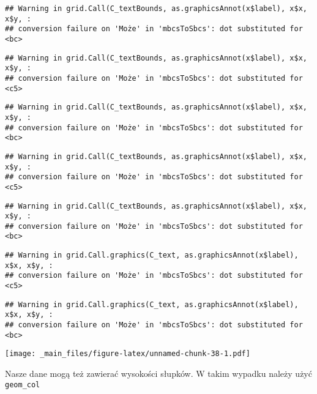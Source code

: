 \documentclass[
]{book}
\begin{document}
\begin{verbatim}
## Warning in grid.Call(C_textBounds, as.graphicsAnnot(x$label), x$x, x$y, :
## conversion failure on 'Może' in 'mbcsToSbcs': dot substituted for <bc>
\end{verbatim}

\begin{verbatim}
## Warning in grid.Call(C_textBounds, as.graphicsAnnot(x$label), x$x, x$y, :
## conversion failure on 'Może' in 'mbcsToSbcs': dot substituted for <c5>
\end{verbatim}

\begin{verbatim}
## Warning in grid.Call(C_textBounds, as.graphicsAnnot(x$label), x$x, x$y, :
## conversion failure on 'Może' in 'mbcsToSbcs': dot substituted for <bc>
\end{verbatim}

\begin{verbatim}
## Warning in grid.Call(C_textBounds, as.graphicsAnnot(x$label), x$x, x$y, :
## conversion failure on 'Może' in 'mbcsToSbcs': dot substituted for <c5>
\end{verbatim}

\begin{verbatim}
## Warning in grid.Call(C_textBounds, as.graphicsAnnot(x$label), x$x, x$y, :
## conversion failure on 'Może' in 'mbcsToSbcs': dot substituted for <bc>
\end{verbatim}

\begin{verbatim}
## Warning in grid.Call.graphics(C_text, as.graphicsAnnot(x$label), x$x, x$y, :
## conversion failure on 'Może' in 'mbcsToSbcs': dot substituted for <c5>
\end{verbatim}

\begin{verbatim}
## Warning in grid.Call.graphics(C_text, as.graphicsAnnot(x$label), x$x, x$y, :
## conversion failure on 'Może' in 'mbcsToSbcs': dot substituted for <bc>
\end{verbatim}

\texttt{[image: \_main\_files/figure-latex/unnamed-chunk-38-1.pdf]}

Nasze dane mogą też zawierać wysokości słupków. W takim wypadku należy użyć \texttt{geom\_col}
\end{document}
